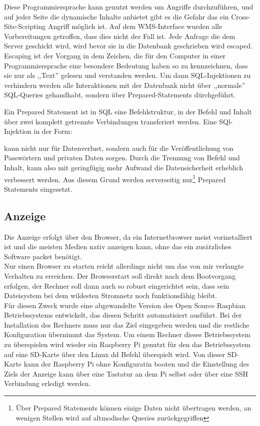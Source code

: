 Diese Programmiersprache kann genutzt werden um Angriffe durchzuführen, und
auf jeder Seite die dynamische Inhalte anbietet gibt es die Gefahr das ein
Cross-Site-Scripting Angriff möglich ist.
Auf dem WMS-Interface wurden alle Vorbereitungen getroffen, dass dies nicht der
Fall ist. Jede Anfrage die dem Server geschickt wird, wird bevor sie in die Datenbank
geschrieben wird escaped. Escaping ist der Vorgang in dem Zeichen, die für den
Computer in einer Programmiersprache eine besondere Bedeutung haben so zu kennzeichnen,
dass sie nur als ,,Text'' gelesen und verstanden werden.
Um dann SQL-Injektionen zu verhindern werden alle Interaktionen mit der Datenbank
nicht über ,,normale'' SQL-Queries gehandhabt, sondern über Prepared-Statements
dürchgeführt.

Ein Prepared Statement ist in SQL eine Befehlstruktur, in der Befehl und Inhalt
über zwei komplett getrennte Verbindungen transferiert werden.
Eine SQl-Injektion in der Form:

kann nicht nur für Datenverlust, sondern auch für die Veröffentlichung
von Passwörtern und privaten Daten sorgen. Durch die Trennung von Befehl und Inhalt,
kann also mit geringfügig mehr Aufwand die Datensicherheit erheblich verbessert werden.
Aus diesem Grund werden serverseitig nur\footnote{Über Prepared Statements
können einige Daten nicht übertragen werden, an wenigen Stellen wird auf altmodische
Queries zurückgegriffen} Prepared Statements eingesetzt.

\subsection{Anzeige}
Die Anzeige erfolgt über den Browser, da ein Internetbrowser meist vorinstalliert ist
und die meisten Medien nativ anzeigen kann, ohne das ein zusätzliches Software packet
benötigt. \\
Nur einen Browser zu starten reicht allerdings nicht um das von mir verlangte Verhalten
zu erreichen. Der Browserstart soll direkt nach dem Bootvorgang erfolgen, der Rechner soll
dann auch so robust eingerichtet sein, dass sein Dateisystem bei dem wildesten Stromnetz
noch funktionsfähig bleibt.\\
Für diesen Zweck wurde eine abgewandelte Version des Open Source Raspbian Betriebssystems
entwickelt, das diesen Schritt automatisiert ausführt. Bei der Installation des
Rechners muss nur das Ziel eingegeben werden und die restliche Konfiguration
übernimmt das System. Um einem Rechner dieses Betriebssystem zu überspielen wird
wieder ein Raspberry Pi genutzt für den das Betriebssystem auf eine SD-Karte über
den Linux dd Befehl überspielt wird. Von dieser SD-Karte kann der Raspberry Pi
ohne Konfiguratin booten und die Einstellung des Ziels der Anzeige kann über eine
Tastatur an dem Pi selbst oder über eine SSH Verbindung erledigt werden.

